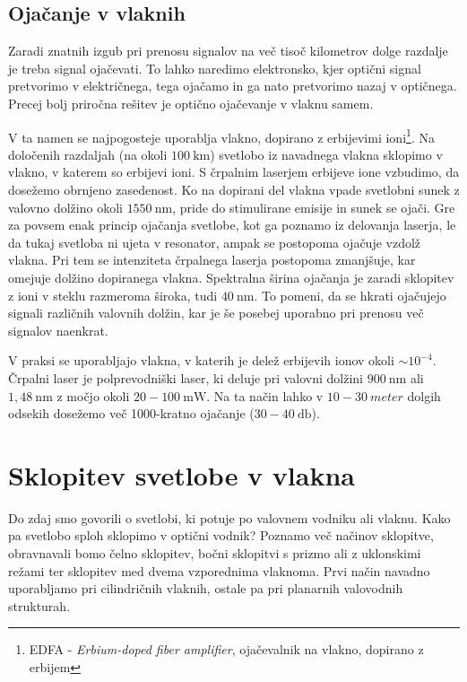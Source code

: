 \subsection*{Ojačanje v vlaknih}
Zaradi znatnih izgub pri prenosu signalov na več tisoč kilometrov dolge razdalje 
je treba signal ojačevati. To lahko naredimo elektronsko, kjer optični signal 
pretvorimo v električnega, tega ojačamo in ga nato pretvorimo nazaj v optičnega. 
Precej bolj priročna rešitev je optično ojačevanje v vlaknu samem. 

V ta namen se najpogosteje uporablja vlakno, dopirano z erbijevimi 
ioni\footnote{EDFA - {\it Erbium-doped fiber amplifier}, ojačevalnik na vlakno, dopirano z erbijem}. 
Na določenih razdaljah (na okoli $100~\si{\kilo\meter}$) svetlobo iz navadnega vlakna 
sklopimo v vlakno, v katerem so erbijevi ioni.
S črpalnim laserjem erbijeve ione vzbudimo, da dosežemo obrnjeno zasedenost. 
Ko na dopirani del vlakna vpade svetlobni sunek z valovno dolžino okoli 
$1550~\si{\nano\meter}$, pride do stimulirane emisije in 
sunek se ojači. Gre za povsem enak princip ojačanja svetlobe, kot ga poznamo iz 
delovanja laserja, le da tukaj svetloba ni ujeta v resonator, ampak se postopoma 
ojačuje vzdolž vlakna. Pri tem se intenziteta črpalnega laserja postopoma zmanjšuje,
kar omejuje dolžino dopiranega vlakna.
Spektralna širina ojačanja je zaradi sklopitev z ioni v steklu 
razmeroma široka, tudi $40~\si{\nano\meter}$. To pomeni, da se hkrati ojačujejo signali različnih 
valovnih dolžin, kar je še posebej uporabno pri prenosu več signalov naenkrat.

V praksi se uporabljajo vlakna, v katerih je delež erbijevih ionov okoli $\sim 10^{-4}$. 
Črpalni laser je polprevodniški laser, ki 
deluje pri valovni dolžini $900~\si{\nano\meter}$ ali $1,48~\si{\nano\meter}$ 
z močjo okoli $20-100~\si{\milli\watt}$. Na ta način lahko v $10-30~\si{meter}$
dolgih odsekih dosežemo več 1000-kratno ojačanje ($30-40~\si{\decibel}$).

\section{Sklopitev svetlobe v vlakna}
Do zdaj smo govorili o svetlobi, ki potuje po valovnem vodniku ali vlaknu. Kako pa 
svetlobo sploh sklopimo v optični vodnik? Poznamo več načinov sklopitve, obravnavali bomo 
čelno sklopitev, bočni sklopitvi s prizmo ali z uklonskimi režami ter  
sklopitev med dvema vzporednima vlaknoma. Prvi način 
navadno uporabljamo pri cilindričnih vlaknih, ostale pa pri planarnih valovodnih strukturah.

